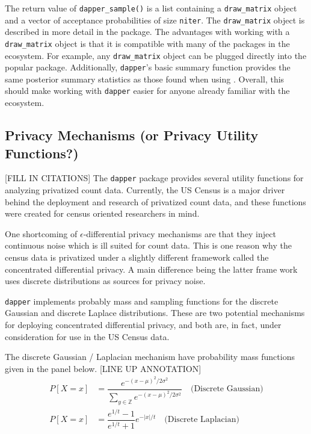 The return value of \texttt{dapper\_sample()} is a list containing
a \texttt{draw\_matrix} object and a vector of acceptance probabilities of size \texttt{niter}. The \texttt{draw\_matrix} object is described
in more detail in the  package. The advantages with working
with a \texttt{draw\_matrix} object is that it is compatible with many of the packages in
the  ecosystem. For example, any \texttt{draw\_matrix} object can be
plugged directly into the popular  package. Additionally,
\texttt{dapper}'s basic summary function provides the same posterior summary statistics
as those found when using . Overall, this should make working with \texttt{dapper} easier
for anyone already familiar with the  ecosystem.

\hypertarget{privacy-mechanisms-or-privacy-utility-functions}{%
\subsection{Privacy Mechanisms (or Privacy Utility Functions?)}\label{privacy-mechanisms-or-privacy-utility-functions}}

{[}FILL IN CITATIONS{]}
The \texttt{dapper} package provides several utility functions
for analyzing privatized count data. Currently, the US Census
is a major driver behind the deployment and research of privatized
count data, and these functions were created for census oriented
researchers in mind.

One shortcoming of \(\epsilon\)-differential privacy mechanisms
are that they inject continuous noise which is ill suited
for count data. This is one reason why the census data is privatized
under a slightly different framework called the concentrated differential privacy.
A main difference being the latter frame work uses discrete distributions as sources for privacy noise.

\texttt{dapper} implements probably mass and sampling functions
for the discrete Gaussian and discrete Laplace distributions. These
are two potential mechanisms for deploying concentrated differential privacy,
and both are, in fact, under consideration for use in the US Census data.

The discrete Gaussian / Laplacian mechanism have probability mass functions given in the
panel below.
{[}LINE UP ANNOTATION{]}
\[
\begin{aligned}
P[X = x] &= \dfrac{e^{-(x - \mu)^2/2\sigma^2}}{\sum_{y \in \mathbb{Z}} e^{-(x-\mu)^2/2\sigma^2}} \quad \text{(Discrete Gaussian)}\\
P[X = x] &= \dfrac{e^{1/t} - 1}{e^{1/t} + 1} e^{-|x|/t} \quad \text{(Discrete Laplacian)}
\end{aligned}
\]

